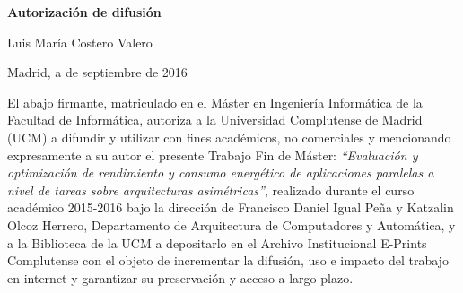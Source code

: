 % 
\newpage

\thispagestyle{empty}

\begin{center}

{\bf \Huge Autorización de difusión}

\vspace{1cm}

% 
   \large Luis María Costero Valero
      
   \vspace{0.5cm}

% 
   Madrid, a  de septiembre de 2016\\

   \vspace{0.5cm} \end{center}

 El abajo firmante, matriculado en el Máster en Ingeniería Informática de
 la Facultad de Informática, autoriza a la Universidad Complutense de
 Madrid (UCM) a difundir y utilizar con fines académicos, no comerciales y
 mencionando expresamente a su autor el presente Trabajo Fin de Máster:
 {\em ``Evaluación y optimización de rendimiento y consumo energético de
   aplicaciones paralelas a nivel de tareas sobre arquitecturas
   asimétricas''}, realizado durante el curso académico 2015-2016 bajo la
 dirección de Francisco Daniel Igual Peña y Katzalin Olcoz Herrero,
 Departamento de Arquitectura de Computadores y Automática, y a la
 Biblioteca de la UCM a depositarlo en el Archivo Institucional E-Prints
 Complutense con el objeto de incrementar la difusión, uso e impacto del
 trabajo en internet y garantizar su preservación y acceso a largo plazo.

